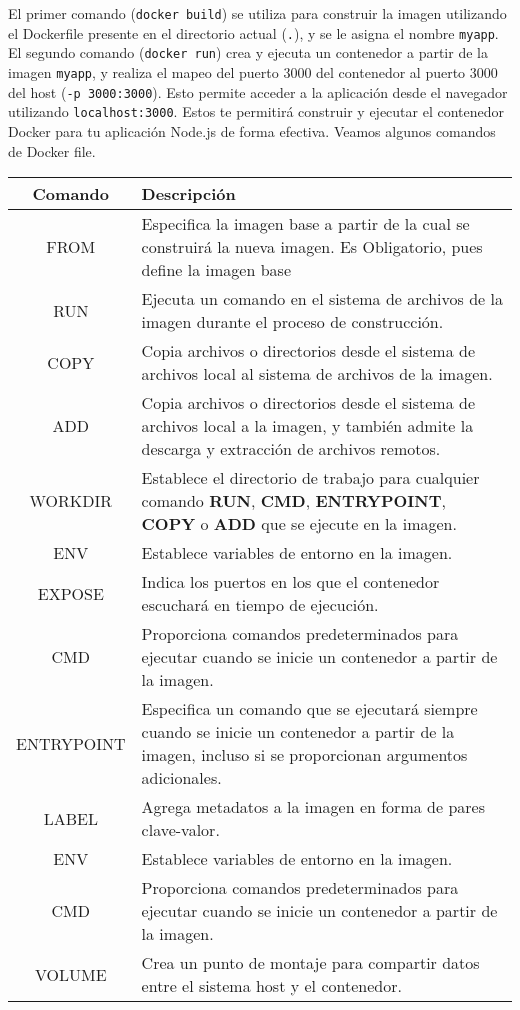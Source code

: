 \documentclass{article}
\begin{document}
El primer comando (\lstinline{docker build}) se utiliza para construir la imagen utilizando el Dockerfile presente en el directorio actual (\lstinline{.}), y se le asigna el nombre \lstinline{myapp}. El segundo comando (\lstinline{docker run}) crea y ejecuta un contenedor a partir de la imagen \lstinline{myapp}, y realiza el mapeo del puerto 3000 del contenedor al puerto 3000 del host (\lstinline{-p 3000:3000}). Esto permite acceder a la aplicación desde el navegador utilizando \lstinline{localhost:3000}. Estos te permitirá construir y ejecutar el contenedor Docker para tu aplicación Node.js de forma efectiva. Veamos algunos comandos de Docker file.
\begin{center}
\begin{tabular}{|c|p{16cm}|}
\hline
\textbf{Comando} & \textbf{Descripción} \\
\hline
FROM & Especifica la imagen base a partir de la cual se construirá la nueva imagen. Es Obligatorio, pues define la imagen base \\
\hline
RUN & Ejecuta un comando en el sistema de archivos de la imagen durante el proceso de construcción. \\
\hline
COPY & Copia archivos o directorios desde el sistema de archivos local al sistema de archivos de la imagen. \\
\hline
ADD & Copia archivos o directorios desde el sistema de archivos local a la imagen, y también admite la descarga y extracción de archivos remotos. \\
\hline
WORKDIR & Establece el directorio de trabajo para cualquier comando \textbf{RUN}, \textbf{CMD}, \textbf{ENTRYPOINT}, \textbf{COPY} o \textbf{ADD} que se ejecute en la imagen. \\
\hline
ENV & Establece variables de entorno en la imagen. \\
\hline
EXPOSE & Indica los puertos en los que el contenedor escuchará en tiempo de ejecución. \\
\hline
CMD & Proporciona comandos predeterminados para ejecutar cuando se inicie un contenedor a partir de la imagen. \\
\hline
ENTRYPOINT & Especifica un comando que se ejecutará siempre cuando se inicie un contenedor a partir de la imagen, incluso si se proporcionan argumentos adicionales. \\
\hline
LABEL & Agrega metadatos a la imagen en forma de pares clave-valor. \\
\hline
ENV & Establece variables de entorno en la imagen. \\
\hline
CMD & Proporciona comandos predeterminados para ejecutar cuando se inicie un contenedor a partir de la imagen. \\
\hline
VOLUME & Crea un punto de montaje para compartir datos entre el sistema host y el contenedor. \\
\hline
\end{tabular}
\end{center}
\end{document}
